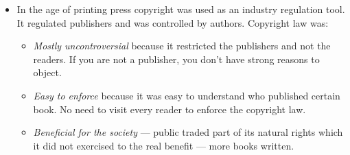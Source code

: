 \documentclass[twoside,openright]{report}
\begin{document}
\begin{itemize}
\begin{itemize}
\end{itemize}
 \item    In the age of printing press copyright was used as an industry regulation tool. It regulated publishers and was controlled by authors. Copyright law was:
\begin{itemize}
 \item        \emph{Mostly uncontroversial} because it restricted the publishers and not the readers. If you are not a publisher, you don't have strong reasons to object.
 \item        \emph{Easy to enforce} because it was easy to understand who published certain book. No need to visit every reader to enforce the copyright law.
 \item        \emph{Beneficial for the society} --- public traded part of its natural rights which it did not exercised to the real benefit --- more books written.
\end{itemize}
\end{itemize}
\end{document}
